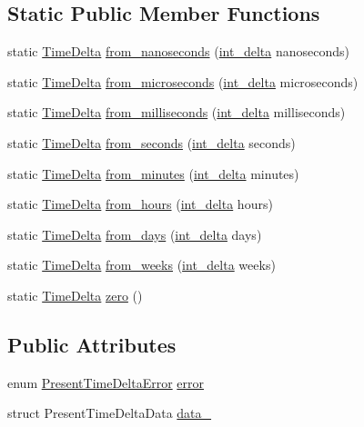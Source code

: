 \subsection*{\-Static \-Public \-Member \-Functions}
\begin{DoxyCompactItemize}
\item 
static \hyperlink{structTimeDelta}{\-Time\-Delta} \hyperlink{structTimeDelta_abc1b517c2156b2d9627fd07d42aecb2f}{from\-\_\-nanoseconds} (\hyperlink{types_8h_a10729255b1946fd4fb654b2fe814910b}{int\-\_\-delta} nanoseconds)
\item 
static \hyperlink{structTimeDelta}{\-Time\-Delta} \hyperlink{structTimeDelta_a32f3fa21ba37d81507383d001f3b704b}{from\-\_\-microseconds} (\hyperlink{types_8h_a10729255b1946fd4fb654b2fe814910b}{int\-\_\-delta} microseconds)
\item 
static \hyperlink{structTimeDelta}{\-Time\-Delta} \hyperlink{structTimeDelta_a01e0919f444379030aa37559fa13542c}{from\-\_\-milliseconds} (\hyperlink{types_8h_a10729255b1946fd4fb654b2fe814910b}{int\-\_\-delta} milliseconds)
\item 
static \hyperlink{structTimeDelta}{\-Time\-Delta} \hyperlink{structTimeDelta_aad4311d8580ade36d8c567576630c967}{from\-\_\-seconds} (\hyperlink{types_8h_a10729255b1946fd4fb654b2fe814910b}{int\-\_\-delta} seconds)
\item 
static \hyperlink{structTimeDelta}{\-Time\-Delta} \hyperlink{structTimeDelta_a244bc3b143bfa760aa2b0cf350cf768c}{from\-\_\-minutes} (\hyperlink{types_8h_a10729255b1946fd4fb654b2fe814910b}{int\-\_\-delta} minutes)
\item 
static \hyperlink{structTimeDelta}{\-Time\-Delta} \hyperlink{structTimeDelta_a912f6ceafac4b9252a1a5d76033754ea}{from\-\_\-hours} (\hyperlink{types_8h_a10729255b1946fd4fb654b2fe814910b}{int\-\_\-delta} hours)
\item 
static \hyperlink{structTimeDelta}{\-Time\-Delta} \hyperlink{structTimeDelta_a9bb1a85b6f27ad8488ae06e238d5808e}{from\-\_\-days} (\hyperlink{types_8h_a10729255b1946fd4fb654b2fe814910b}{int\-\_\-delta} days)
\item 
static \hyperlink{structTimeDelta}{\-Time\-Delta} \hyperlink{structTimeDelta_ae0f0a41d899e62b9d17bc4542c443ec6}{from\-\_\-weeks} (\hyperlink{types_8h_a10729255b1946fd4fb654b2fe814910b}{int\-\_\-delta} weeks)
\item 
static \hyperlink{structTimeDelta}{\-Time\-Delta} \hyperlink{structTimeDelta_a2dec837a107c5e46e14b9c69557209fa}{zero} ()
\end{DoxyCompactItemize}
\subsection*{\-Public \-Attributes}
\begin{DoxyCompactItemize}
\item 
enum \hyperlink{time-delta_8h_a6090105e9137c36754994cda35937b59}{\-Present\-Time\-Delta\-Error} \hyperlink{structTimeDelta_a212d89d50dc636a4e12ceac5fd9f0bfd}{error}
\item 
struct \-Present\-Time\-Delta\-Data \hyperlink{structTimeDelta_ab88989772d6ab486e1e008238d96eb81}{data\-\_\-}
\end{DoxyCompactItemize}
